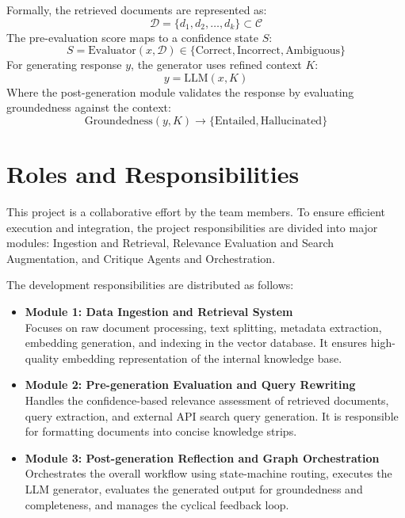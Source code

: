 \documentclass[12pt,a4paper]{article}
\begin{document}
Formally, the retrieved documents are represented as:
\begin{equation*}
    \mathcal{D} = \{d_1, d_2, \dots, d_k\} \subset \mathcal{C}
\end{equation*}
The pre-evaluation score maps to a confidence state $S$:
\begin{equation*}
    S = \text{Evaluator}(x, \mathcal{D}) \in \{\text{Correct}, \text{Incorrect}, \text{Ambiguous}\}
\end{equation*}
For generating response $y$, the generator uses refined context $K$:
\begin{equation*}
    y = \text{LLM}(x, K)
\end{equation*}
Where the post-generation module validates the response by evaluating groundedness against the context:
\begin{equation*}
    \text{Groundedness}(y, K) \to \{\text{Entailed}, \text{Hallucinated}\}
\end{equation*}

\newpage

\section{Roles and Responsibilities}
This project is a collaborative effort by the team members. To ensure efficient execution and integration, the project responsibilities are divided into major modules: Ingestion and Retrieval, Relevance Evaluation and Search Augmentation, and Critique Agents and Orchestration. 

The development responsibilities are distributed as follows:
\begin{itemize}
    \item \textbf{Module 1: Data Ingestion and Retrieval System} \\
    Focuses on raw document processing, text splitting, metadata extraction, embedding generation, and indexing in the vector database. It ensures high-quality embedding representation of the internal knowledge base.
    
    \item \textbf{Module 2: Pre-generation Evaluation and Query Rewriting} \\
    Handles the confidence-based relevance assessment of retrieved documents, query extraction, and external API search query generation. It is responsible for formatting documents into concise knowledge strips.
    
    \item \textbf{Module 3: Post-generation Reflection and Graph Orchestration} \\
    Orchestrates the overall workflow using state-machine routing, executes the LLM generator, evaluates the generated output for groundedness and completeness, and manages the cyclical feedback loop.
\end{itemize}
\end{document}
